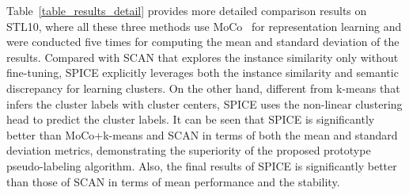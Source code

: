 \documentclass[journal]{IEEEtran}
\begin{document}
\begin{table}[ht]
\footnotesize
\renewcommand{\arraystretch}{1.2}
\renewcommand\tabcolsep{6.8pt}
\caption{More detailed comparison results on STL10. Here all methods were trained and tested on the split train and test datasets respectively. Both the mean and standard deviation results were reported. Each method was conducted five times. Here all methods used the ResNet18 backbone, SCAN and SPICE used MoCo for feature learning with STL10 images only. SCAN means no self-labeling.}
\label{table_results_detail}
\centering
{}
\end{table}
Table~\ref{table_results_detail} provides more detailed comparison results on STL10, where all these three methods use MoCo~\cite{He_2020_CVPR} for representation learning and were conducted five times for computing the mean and standard deviation of the results.
Compared with SCAN that explores the instance similarity only without fine-tuning, SPICE explicitly leverages both the instance similarity and semantic discrepancy for learning clusters. On the other hand, different from k-means that infers the cluster labels with cluster centers, SPICE uses the non-linear clustering head to predict the cluster labels.
It can be seen that SPICE is significantly better than MoCo+k-means and SCAN  in terms of both the mean and standard deviation metrics, demonstrating the superiority of the proposed prototype pseudo-labeling algorithm.
Also, the final results of SPICE is significantly better than those of SCAN in terms of mean performance and the stability.
\end{document}
